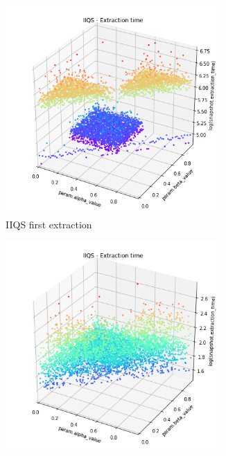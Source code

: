 \begin{figure}
    \centering
    \begin{subfigure}[b]{0.45\textwidth}
        \centering
        \includegraphics[width=0.9\textwidth]{./fragments/04_experimental_execution/images/04_alpabeta_singleclass.png.1_0.png}
        \caption{IIQS first extraction}
        \label{FIG:05_ALPHABETA_RELATIONSHIP_RANDOM__0_0}
    \end{subfigure}
    \hfill
    \begin{subfigure}[b]{0.45\textwidth}
        \centering
        \includegraphics[width=0.9\textwidth]{./fragments/04_experimental_execution/images/04_alpabeta_singleclass.png.0_0.png}

\end{subfigure}
\end{figure}
